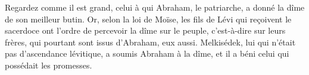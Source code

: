 Regardez comme il est grand,
	celui à qui Abraham, le patriarche, a donné la dîme de son meilleur butin.
Or, selon la loi de Moïse,
	les fils de Lévi qui reçoivent le sacerdoce
		ont l’ordre de percevoir la dîme sur le peuple,
	c’est-à-dire sur leurs frères, qui pourtant sont issus d’Abraham, eux aussi.
Melkisédek, lui qui n’était pas d’ascendance lévitique,
	a soumis Abraham à la dîme, et il a béni celui qui possédait les promesses.
